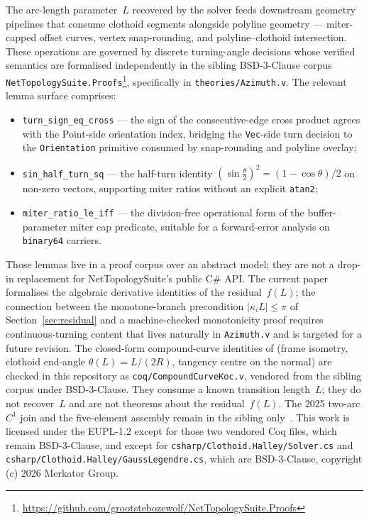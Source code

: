 \documentclass[11pt,a4paper]{article}
\begin{document}
The arc-length parameter~$L$ recovered by the solver feeds downstream geometry pipelines that consume clothoid segments alongside polyline geometry --- miter-capped offset curves, vertex snap-rounding, and polyline--clothoid intersection. These operations are governed by discrete turning-angle decisions whose verified semantics are formalised independently in the sibling BSD-3-Clause corpus \texttt{NetTopologySuite.Proofs}\footnote{\url{https://github.com/grootstebozewolf/NetTopologySuite.Proofs}}, specifically in \texttt{theories/Azimuth.v}. The relevant lemma surface comprises:
\begin{itemize}
    \item \texttt{turn\_sign\_eq\_cross} --- the sign of the consecutive-edge cross product agrees with the Point-side orientation index, bridging the \texttt{Vec}-side turn decision to the \texttt{Orientation} primitive consumed by snap-rounding and polyline overlay;
    \item \texttt{sin\_half\_turn\_sq} --- the half-turn identity $(\sin\tfrac{\theta}{2})^2 = (1 - \cos\theta)/2$ on non-zero vectors, supporting miter ratios without an explicit \texttt{atan2};
    \item \texttt{miter\_ratio\_le\_iff} --- the division-free operational form of the buffer-parameter miter cap predicate, suitable for a forward-error analysis on \texttt{binary64} carriers.
\end{itemize}
Those lemmas live in a proof corpus over an abstract model; they are not a drop-in replacement for NetTopologySuite's public C\# API. The current paper formalises the algebraic derivative identities of the residual~$f(L)$; the connection between the monotone-branch precondition $|\kappa_i L| \le \pi$ of Section~\ref{sec:residual} and a machine-checked monotonicity proof requires continuous-turning content that lives naturally in \texttt{Azimuth.v} and is targeted for a future revision. The closed-form compound-curve identities of \citet{Koc2015} (frame isometry, clothoid end-angle $\theta(L)=L/(2R)$, tangency centre on the normal) are checked in this repository as \texttt{coq/CompoundCurveKoc.v}, vendored from the sibling corpus under BSD-3-Clause. They consume a known transition length~$L$; they do not recover~$L$ and are not theorems about the residual~$f(L)$. The 2025 two-arc $C^1$ join and the five-element assembly remain in the sibling only~\citep{Koc2025}. This work is licensed under the EUPL-1.2 except for those two vendored Coq files, which remain BSD-3-Clause, and except for \texttt{csharp/Clothoid.Halley/Solver.cs} and \texttt{csharp/Clothoid.Halley/GaussLegendre.cs}, which are BSD-3-Clause, copyright (c) 2026 Merkator Group.
\end{document}
